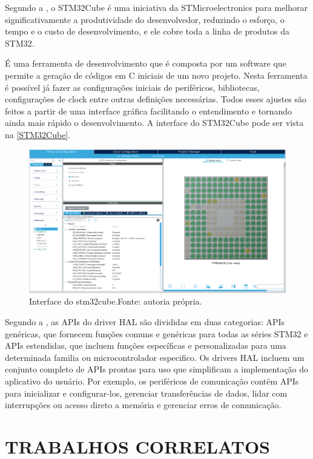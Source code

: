 Segundo a , o STM32Cube é uma iniciativa da STMicroelectronics para melhorar significativamente a produtividade do desenvolvedor, reduzindo o esforço, o tempo e o custo de desenvolvimento, e ele cobre toda a linha de produtos da STM32.

É uma ferramenta de desenvolvimento que é composta por um software que permite a geração de códigos em C iniciais de um novo projeto. Nesta ferramenta é possível já fazer as configurações iniciais de periféricos, bibliotecas, configurações de clock entre outras definições necessárias. Todos esses ajustes são feitos a partir de uma interface gráfica facilitando o entendimento e tornando ainda mais rápido o desenvolvimento. A interface do STM32Cube pode ser vista na \autoref{STM32Cube}.
\begin{figure}[H]
    \scriptsize
     \centering
     \includegraphics[scale=0.43]{dados/figuras/stm32cube.png}
     \caption{Interface do stm32cube.\newline  Fonte: autoria própria.}
     \label{STM32Cube}
\end{figure}

Segundo a , as APIs do driver HAL são divididas em duas categorias: APIs genéricas, que fornecem funções comuns e genéricas para todas as séries STM32 e APIs estendidas, que incluem funções específicas e personalizadas para uma determinada familia ou microcontrolador especifico. Os drivers HAL incluem um conjunto completo de APIs prontas para uso que simplificam a implementação do aplicativo do usuário. Por exemplo, os periféricos de comunicação contêm APIs para inicializar e configurar-los, gerenciar transferências de dados, lidar com interrupções ou acesso direto a memória e gerenciar erros de comunicação.

\section{TRABALHOS CORRELATOS}

